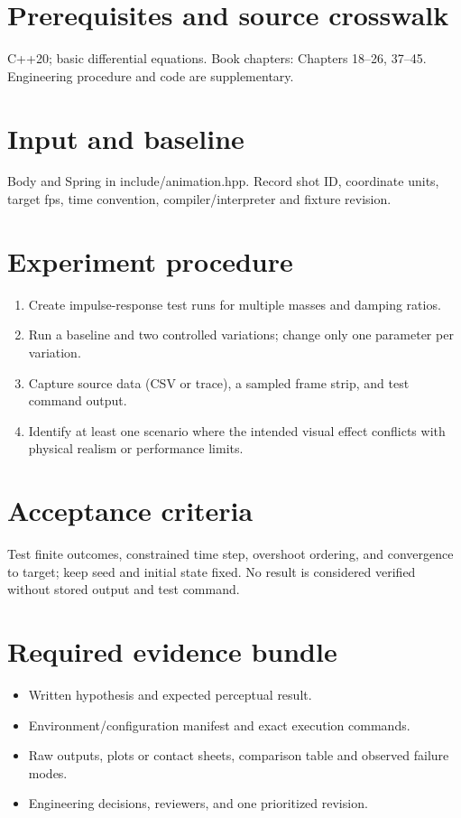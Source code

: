 \documentclass[10pt,letterpaper]{article}
\begin{document}
\makedoctitle
\makedocsummary

\section{Prerequisites and source crosswalk}
C++20; basic differential equations. Book chapters: Chapters 18--26, 37--45. Engineering procedure and code are supplementary.
\section{Input and baseline}
Body and Spring in include/animation.hpp. Record shot ID, coordinate units, target fps, time convention, compiler/interpreter and fixture revision.
\section{Experiment procedure}
\begin{enumerate}
\item Create impulse-response test runs for multiple masses and damping ratios.
\item Run a baseline and two controlled variations; change only one parameter per variation.
\item Capture source data (CSV or trace), a sampled frame strip, and test command output.
\item Identify at least one scenario where the intended visual effect conflicts with physical realism or performance limits.
\end{enumerate}
\section{Acceptance criteria}
Test finite outcomes, constrained time step, overshoot ordering, and convergence to target; keep seed and initial state fixed. No result is considered verified without stored output and test command.
\section{Required evidence bundle}
\begin{itemize}
\item Written hypothesis and expected perceptual result.
\item Environment/configuration manifest and exact execution commands.
\item Raw outputs, plots or contact sheets, comparison table and observed failure modes.
\item Engineering decisions, reviewers, and one prioritized revision.
\end{itemize}
\end{document}
